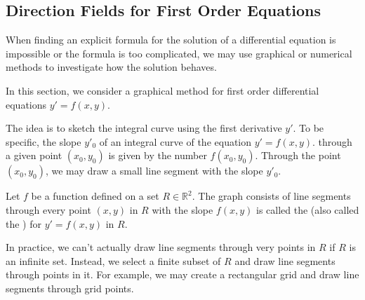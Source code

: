 \subsection{Direction Fields for First Order Equations}

When finding an explicit formula for the solution of a differential equation is impossible or the formula is too complicated, we may use graphical or numerical methods to investigate how the solution behaves.

In this section, we consider a graphical method for first order differential equations $y'=f(x, y)$.

The idea is to sketch the integral curve using the first derivative $y'$. To be specific, the slope $y'_0$ of an integral curve of the equation $y'=f(x, y)$. through a given point $(x_0,y_0)$ is given by the number $f(x_0,y_0)$. Through the point $(x_0, y_0)$, we may draw a small line segment with the slope $y'_0$.

\begin{definition}{}{}
  Let $f$ be a function defined on a set $R\in \mathbb{R}^2$.
  The graph consists of line segments through every point $(x, y)$ in $R$ with the slope $f(x, y)$ is called the  (also called the ) for $y'=f(x, y)$ in $R$.
\end{definition}

In practice, we can't actually draw line segments through very points in $R$ if $R$ is an infinite set. Instead, we select a finite subset of $R$ and draw line segments through points in it. For example, we may create a rectangular grid and draw line segments through grid points.

